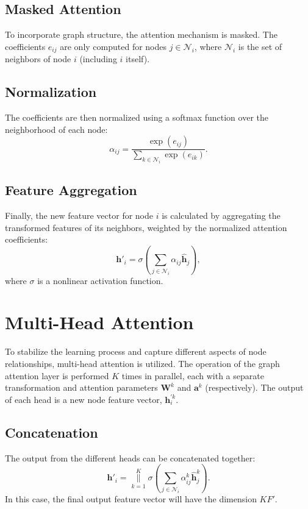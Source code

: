 \documentclass{article}
\begin{document}
	\subsection{Masked Attention}
	To incorporate graph structure, the attention mechanism is masked. The coefficients $e_{ij}$ are only computed for nodes $j \in \mathcal{N}_i$, where $\mathcal{N}_i$ is the set of neighbors of node $i$ (including $i$ itself).
	
	\subsection{Normalization}
	The coefficients are then normalized using a softmax function over the neighborhood of each node:
	\begin{equation}
		\alpha_{ij} = \frac{\exp(e_{ij})}{\sum_{k \in \mathcal{N}_i} \exp(e_{ik})}.
	\end{equation}
	
	\subsection{Feature Aggregation}
	Finally, the new feature vector for node $i$ is calculated by aggregating the transformed features of its neighbors, weighted by the normalized attention coefficients:
	\begin{equation}
		\mathbf{h}'_i = \sigma \left( \sum_{j \in \mathcal{N}_i} \alpha_{ij} \hat{\mathbf{h}}_j \right),
	\end{equation}
	where $\sigma$ is a nonlinear activation function.
	
	\section{Multi-Head Attention}
	To stabilize the learning process and capture different aspects of node relationships, multi-head attention is utilized.  The operation of the graph attention layer is performed $K$ times in parallel, each with a separate transformation and attention parameters $\mathbf{W}^k$ and $\mathbf{a}^k$ (respectively). The output of each head is a new node feature vector, $\mathbf{h}_i^{'k}$.
	
	\subsection{Concatenation}
	The output from the different heads can be concatenated together:
	\begin{equation}
		\mathbf{h}'_i = \underset{k=1}{\overset{K}{\parallel}} \sigma \left( \sum_{j \in \mathcal{N}_i} \alpha_{ij}^k \mathbf{\hat{h}}_j^k \right).
	\end{equation}
	In this case, the final output feature vector will have the dimension $KF'$.
	
\end{document}
